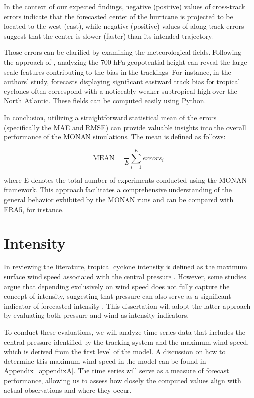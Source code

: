In the context of our expected findings, negative (positive) values of cross-track errors indicate that the forecasted center of the hurricane is projected to be located to the west (east), while negative (positive) values of along-track errors suggest that the center is slower (faster) than its intended trajectory.

Those errors can be clarified by examining the meteorological fields. Following the approach of , analyzing the 700 hPa geopotential height can reveal the large-scale features contributing to the bias in the trackings. For instance, in the authors' study, forecasts displaying significant eastward track bias for tropical cyclones often correspond with a noticeably weaker subtropical high over the North Atlantic. These fields can be computed easily using Python.

In conclusion, utilizing a straightforward statistical mean of the errors (specifically the MAE and RMSE) can provide valuable insights into the overall performance of the MONAN simulations. The mean is defined as follows:

\begin{equation}
    \text{MEAN} = \frac{1}{E} \sum_{i=1}^{E} errors_i
\end{equation}

where E denotes the total number of experiments conducted using the MONAN framework. This approach facilitates a comprehensive understanding of the general behavior exhibited by the MONAN runs and can be compared with ERA5, for instance.

\section{Intensity}

In reviewing the literature, tropical cyclone intensity is defined as the maximum surface wind speed associated with the central pressure \cite{demaria2007evaluation, landsea2013atlantic}. However, some studies argue that depending exclusively on wind speed does not fully capture the concept of intensity, suggesting that pressure can also serve as a significant indicator of forecasted intensity \cite{shepherd2017sensitivity, heming2017tropical}. This dissertation will adopt the latter approach by evaluating both pressure and wind as intensity indicators.

To conduct these evaluations, we will analyze time series data that includes the central pressure identified by the tracking system and the maximum wind speed, which is derived from the first level of the model. A discussion on how to determine this maximum wind speed in the model can be found in Appendix~\ref{appendixA}. The time series will serve as a measure of forecast performance, allowing us to assess how closely the computed values align with actual observations and where they occur.

